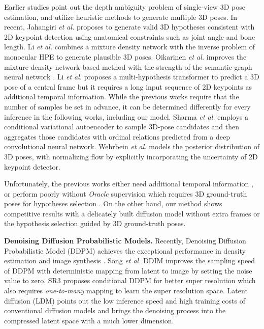 \documentclass[letterpaper, 10 pt, conference]{ieeeconf}
\begin{document}
Earlier studies \cite{sminchisescu2003kinematic, simo2012single} point out the depth ambiguity problem of single-view 3D pose estimation, and utilize heuristic methods to generate multiple 3D poses.
In recent, Jahangiri \textit{et al.} \cite{jahangiri2017generating} proposes to generate valid 3D hypotheses consistent with 2D keypoint detection using anatomical constraints such as joint angle and bone length.
Li \textit{et al.} \cite{li2019generating} combines a mixture density network \cite{bishop1994mixture} with the inverse problem of monocular HPE to generate plausible 3D poses.
Oikarinen \textit{et al.} \cite{oikarinen2021graphmdn} improves the mixture density network-based method \cite{li2019generating} with the strength of the semantic graph neural network \cite{zhao2019semantic}.
Li \textit{et al.} \cite{li2022mhformer} proposes a multi-hypothesis transformer to predict a 3D pose of a central frame but it requires a long input sequence of 2D keypoints as additional temporal information.
While the previous works require that the number of samples be set in advance, it can be determined differently for every inference in the following works, including our model.
Sharma \textit{et al.} \cite{sharma2019monocular} employs a conditional variational autoencoder to sample 3D-pose candidates and then aggregates those candidates with ordinal relations predicted from a deep convolutional neural network.
Wehrbein \textit{et al.} \cite{wehrbein2021probabilistic} models the posterior distribution of 3D poses, with normalizing flow by explicitly incorporating the uncertainty of 2D keypoint detector.

Unfortunately, the previous works either need additional temporal information \cite{li2022mhformer}, or perform poorly without \textit{Oracle} supervision which requires 3D ground-truth poses for hypotheses selection \cite{sharma2019monocular, wehrbein2021probabilistic}.
On the other hand, our method shows competitive results with a delicately built diffusion model without extra frames or the hypothesis selection guided by 3D ground-truth poses.

\noindent\textbf{Denoising Diffusion Probabilistic Models.}
Recently, Denoising Diffusion Probabilistic Model (DDPM) \cite{ho2020denoising} achieves the exceptional performance  in density estimation \cite{kingma2021variational} and image synthesis \cite{rombach2022high, dhariwal2021diffusion, song2020denoising}.
Song \textit{et al.} DDIM \cite{song2020denoising} improves the sampling speed of DDPM with deterministic mapping from latent to image by setting the noise value to zero.
SR3 \cite{saharia2022image} proposes conditional DDPM for better super resolution which also requires \textit{one-to-many} mapping to learn the super resolution space.
Latent diffusion \cite{rombach2022high} (LDM) points out the low inference speed and high training costs of conventional diffusion models and brings the denoising process into the compressed latent space with a much lower dimension.
\end{document}
